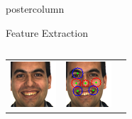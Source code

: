 \documentclass[final,hyperref={pdfpagelabels=false}]{beamer}
\begin{document}
\begin{frame}
\begin{columns}
\begin{column}{.49\textwidth}
\begin{beamercolorbox}[center,wd=\textwidth]{postercolumn}
\begin{minipage}[T]{.95\textwidth}
{\begin{block}{Feature Extraction}
\begin{columns}
\begin{column}{.44\textwidth}
\begin{tabularx}{\linewidth}{ZZZ}
                    \includegraphics[width=0.95\linewidth]{images/viola/m-012-2.png}
                    &
                    \includegraphics[width=0.95\linewidth]{images/viola/surf-64x64-ip/m-012-2.pngsurf.png}
                    &

\end{tabularx}
\end{column}
\end{columns}
\end{block}}
\end{minipage}
\end{beamercolorbox}
\end{column}
\end{columns}
\end{frame}
\end{document}
